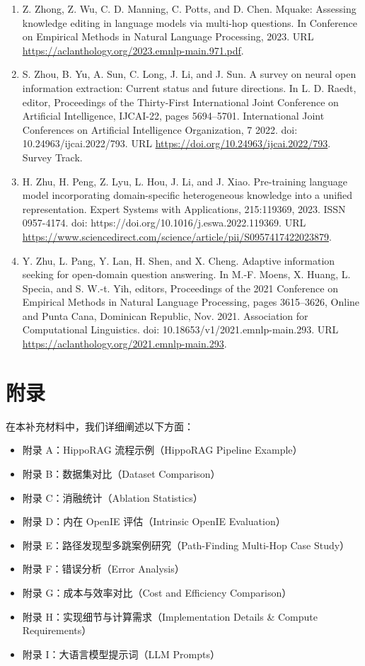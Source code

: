 \documentclass[11pt,UTF8,fontset=fandol]{ctexart}
\begin{document}
\begin{enumerate}[leftmargin=2em]
\item Z. Zhong, Z. Wu, C. D. Manning, C. Potts, and D. Chen. Mquake: Assessing knowledge editing in language models via multi-hop questions. In Conference on Empirical Methods in Natural Language Processing, 2023. URL \url{https://aclanthology.org/2023.emnlp-main.971.pdf}.
\item S. Zhou, B. Yu, A. Sun, C. Long, J. Li, and J. Sun. A survey on neural open information extraction: Current status and future directions. In L. D. Raedt, editor, Proceedings of the Thirty-First International Joint Conference on Artificial Intelligence, IJCAI-22, pages 5694--5701. International Joint Conferences on Artificial Intelligence Organization, 7 2022. doi: 10.24963/ijcai.2022/793. URL \url{https://doi.org/10.24963/ijcai.2022/793}. Survey Track.
\item H. Zhu, H. Peng, Z. Lyu, L. Hou, J. Li, and J. Xiao. Pre-training language model incorporating domain-specific heterogeneous knowledge into a unified representation. Expert Systems with Applications, 215:119369, 2023. ISSN 0957-4174. doi: https://doi.org/10.1016/j.eswa.2022.119369. URL \url{https://www.sciencedirect.com/science/article/pii/S0957417422023879}.
\item Y. Zhu, L. Pang, Y. Lan, H. Shen, and X. Cheng. Adaptive information seeking for open-domain question answering. In M.-F. Moens, X. Huang, L. Specia, and S. W.-t. Yih, editors, Proceedings of the 2021 Conference on Empirical Methods in Natural Language Processing, pages 3615--3626, Online and Punta Cana, Dominican Republic, Nov. 2021. Association for Computational Linguistics. doi: 10.18653/v1/2021.emnlp-main.293. URL \url{https://aclanthology.org/2021.emnlp-main.293}.
\end{enumerate}

\appendix
\section*{附录}

在本补充材料中，我们详细阐述以下方面：
\begin{itemize}[leftmargin=2em]
\item 附录 A：HippoRAG 流程示例（HippoRAG Pipeline Example）
\item 附录 B：数据集对比（Dataset Comparison）
\item 附录 C：消融统计（Ablation Statistics）
\item 附录 D：内在 OpenIE 评估（Intrinsic OpenIE Evaluation）
\item 附录 E：路径发现型多跳案例研究（Path-Finding Multi-Hop Case Study）
\item 附录 F：错误分析（Error Analysis）
\item 附录 G：成本与效率对比（Cost and Efficiency Comparison）
\item 附录 H：实现细节与计算需求（Implementation Details \& Compute Requirements）
\item 附录 I：大语言模型提示词（LLM Prompts）
\end{itemize}
\end{document}
